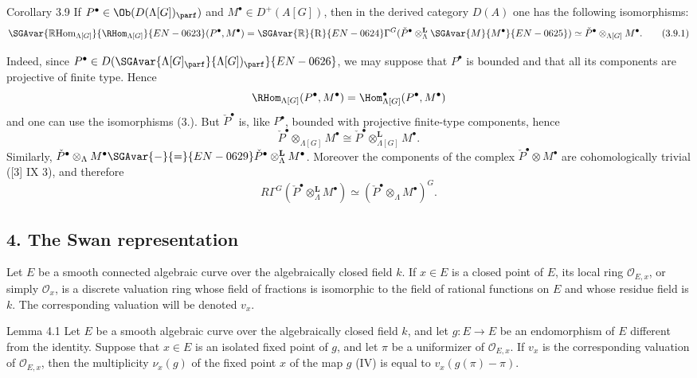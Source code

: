 \begin{statement}{Corollary 3.9}
If $P^\bullet\in\Ob(D(\Lambda[G])_{\parf})$ and $M^\bullet\in D^+(A[G])$, then in the derived category $D(A)$ one has the following isomorphisms:
\[
\SGAvar{\mathbb{R}\mathrm{Hom}_{\Lambda[G]}}{\RHom_{\Lambda[G]}}{EN-0623}(P^\bullet,M^\bullet)
=\SGAvar{\mathbb{R}}{\mathrm{R}}{EN-0624}\Gamma^G(\check P^\bullet\otimes_\Lambda^{\mathbf L}\SGAvar{M}{M^\bullet}{EN-0625})
\simeq \check P^\bullet\otimes_{\Lambda[G]}M^\bullet.
\tag{3.9.1}
\]
\end{statement}

Indeed, since $P^\bullet\in D(\SGAvar{\Lambda[G]_{\parf}}{\Lambda[G])_{\parf}}{EN-0626}$, we may suppose that $P^\bullet$ is bounded and that all its components are projective of finite type. Hence
\[
\RHom_{\Lambda[G]}(P^\bullet,M^\bullet)=\Hom_{\Lambda[G]}^\bullet(P^\bullet,M^\bullet)
\]
and one can use the isomorphisms (3.). But $\check P^\bullet$ is, like $P^\bullet$, bounded with projective finite-type components, hence
\[
\check P^\bullet\otimes_{\Lambda[G]}M^\bullet\cong
\check P^\bullet\otimes_{\Lambda[G]}^{\mathbf L}M^\bullet.
\]
Similarly, $\check P^\bullet\otimes_\Lambda M^\bullet\SGAvar{-}{=}{EN-0629}\check P^\bullet\otimes_\Lambda^{\mathbf L}M^\bullet$. Moreover the components of the complex $\check P^\bullet\otimes M^\bullet$ are cohomologically trivial ([3] IX 3), and therefore
\[
R\Gamma^G(\check P^\bullet\otimes_\Lambda^{\mathbf L}M^\bullet)
\simeq (\check P^\bullet\otimes_\Lambda M^\bullet)^G.
\]

\subsection*{4. The Swan representation}

Let $E$ be a smooth connected algebraic curve over the algebraically closed field $k$. If $x\in E$ is a closed point of $E$, its local ring $\mathcal O_{E,x}$, or simply $\mathcal O_x$, is a discrete valuation ring whose field of fractions is isomorphic to the field of rational functions on $E$ and whose residue field is $k$. The corresponding valuation will be denoted $v_x$.

\begin{statement}{Lemma 4.1}
Let $E$ be a smooth algebraic curve over the algebraically closed field $k$, and let $g:E\to E$ be an endomorphism of $E$ different from the identity. Suppose that $x\in E$ is an isolated fixed point of $g$, and let $\pi$ be a uniformizer of $\mathcal O_{E,x}$. If $v_x$ is the corresponding valuation of $\mathcal O_{E,x}$, then the multiplicity $\nu_x(g)$ of the fixed point $x$ of the map $g$ (IV) is equal to $v_x(g(\pi)-\pi)$.
\end{statement}


